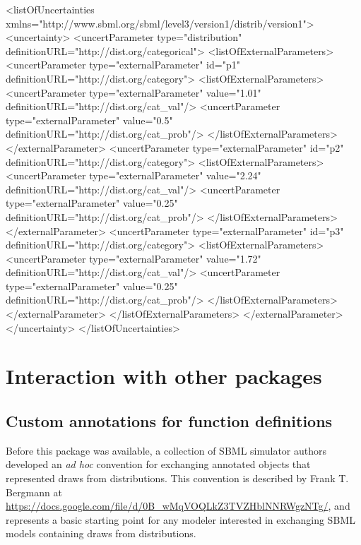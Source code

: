 \documentclass[draftspec]{sbmlpkgspec}
\begin{document}
\begin{blockChanged}
\begin{example}
<listOfUncertainties xmlns="http://www.sbml.org/sbml/level3/version1/distrib/version1">
  <uncertainty>
    <uncertParameter type="distribution" definitionURL="http://dist.org/categorical">
      <listOfExternalParameters>
        <uncertParameter type="externalParameter" id="p1" definitionURL="http://dist.org/category">
          <listOfExternalParameters>
            <uncertParameter type="externalParameter" value="1.01"
                             definitionURL="http://dist.org/cat_val"/>
            <uncertParameter type="externalParameter" value="0.5"
                             definitionURL="http://dist.org/cat_prob"/>
          </listOfExternalParameters>
        </externalParameter>
        <uncertParameter type="externalParameter" id="p2" definitionURL="http://dist.org/category">
          <listOfExternalParameters>
            <uncertParameter type="externalParameter" value="2.24"
                             definitionURL="http://dist.org/cat_val"/>
            <uncertParameter type="externalParameter" value="0.25"
                             definitionURL="http://dist.org/cat_prob"/>
          </listOfExternalParameters>
        </externalParameter>
        <uncertParameter type="externalParameter" id="p3" definitionURL="http://dist.org/category">
          <listOfExternalParameters>
            <uncertParameter type="externalParameter" value="1.72"
                             definitionURL="http://dist.org/cat_val"/>
            <uncertParameter type="externalParameter" value="0.25"
                             definitionURL="http://dist.org/cat_prob"/>
          </listOfExternalParameters>
        </externalParameter>
      </listOfExternalParameters>
    </externalParameter>
  </uncertainty>
</listOfUncertainties>
\end{example}

\end{blockChanged}

\clearpage
\section{Interaction with other packages}

\subsection{Custom annotations for function definitions}
\label{sec:annotation-scheme}
Before this package was available, a collection of SBML simulator authors developed an \emph{ad hoc} convention for exchanging annotated \FunctionDefinition objects that represented draws from distributions.  This convention is described by Frank T. Bergmann at \url{https://docs.google.com/file/d/0B_wMqVOQLkZ3TVZHblNNRWgzNTg/}, and represents a basic starting point for any modeler interested in exchanging SBML models containing draws from distributions.
\end{document}
